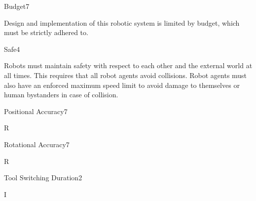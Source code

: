 \begin{nonfunctional_requirement}{Budget}{7}
\label{nfr:budget}
\item Design and implementation of this robotic system is limited by budget, which must be strictly adhered to. 
\end{nonfunctional_requirement}

\begin{nonfunctional_requirement}{Safe}{4}
\label{nfr:safe}
\item Robots must maintain safety with respect to each other and the external world at all times. This requires that all robot agents avoid collisions. Robot agents must also have an enforced maximum speed limit to avoid damage to themselves or human bystanders in case of collision. 
\end{nonfunctional_requirement}

\begin{nonfunctional_requirement}{Positional Accuracy}{7}
\label{nfr:pos_accuracy}
\item R
\end{nonfunctional_requirement}

\begin{nonfunctional_requirement}{Rotational Accuracy}{7}
\label{nfr:rot_accuracy}
\item R
\end{nonfunctional_requirement}

\begin{nonfunctional_requirement}{Tool Switching Duration}{2}
\label{nfr:tool_switch_duration}
\item I
\end{nonfunctional_requirement}


